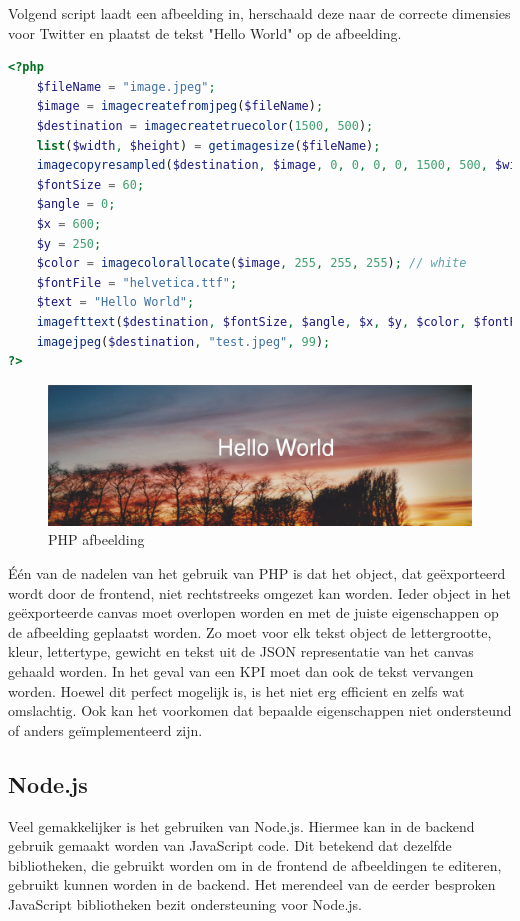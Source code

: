 Volgend script laadt een afbeelding in, herschaald deze naar de correcte dimensies voor Twitter en plaatst de tekst "Hello World" op de afbeelding.
\begin{lstlisting}[language=PHP]
<?php
	$fileName = "image.jpeg";
	$image = imagecreatefromjpeg($fileName);
	$destination = imagecreatetruecolor(1500, 500);
	list($width, $height) = getimagesize($fileName);
	imagecopyresampled($destination, $image, 0, 0, 0, 0, 1500, 500, $width, $height);
	$fontSize = 60;
	$angle = 0;
	$x = 600;
	$y = 250;
	$color = imagecolorallocate($image, 255, 255, 255); // white
	$fontFile = "helvetica.ttf";
	$text = "Hello World";
	imagefttext($destination, $fontSize, $angle, $x, $y, $color, $fontFile, $text);
	imagejpeg($destination, "test.jpeg", 99);
?>
\end{lstlisting}

\begin{figure}[H]
	\centering
	\includegraphics[width=1\textwidth]{Figuren/PHP_rendering.jpeg}
	\caption{PHP afbeelding \cite{}}
	\label{fig:PHP}
\end{figure} 
%

\'{E}\'{e}n van de nadelen van het gebruik van PHP is dat het object, dat ge\"{e}xporteerd wordt door de frontend, niet rechtstreeks omgezet kan worden. Ieder object in het ge\"{e}xporteerde canvas moet overlopen worden en met de juiste eigenschappen op de afbeelding geplaatst worden. Zo moet voor elk tekst object de lettergrootte, kleur, lettertype, gewicht en tekst uit de JSON representatie van het canvas gehaald worden. In het geval van een KPI moet dan ook de tekst vervangen worden. Hoewel dit perfect mogelijk is, is het niet erg efficient en zelfs wat omslachtig. Ook kan het voorkomen dat bepaalde eigenschappen niet ondersteund of anders ge\"{i}mplementeerd zijn. 

\subsection{Node.js}
Veel gemakkelijker is het gebruiken van Node.js. Hiermee kan in de backend gebruik gemaakt worden van JavaScript code. Dit betekend dat dezelfde bibliotheken, die gebruikt worden om in de frontend de afbeeldingen te editeren, gebruikt kunnen worden in de backend. Het merendeel van de eerder besproken JavaScript bibliotheken bezit ondersteuning voor Node.js. 

